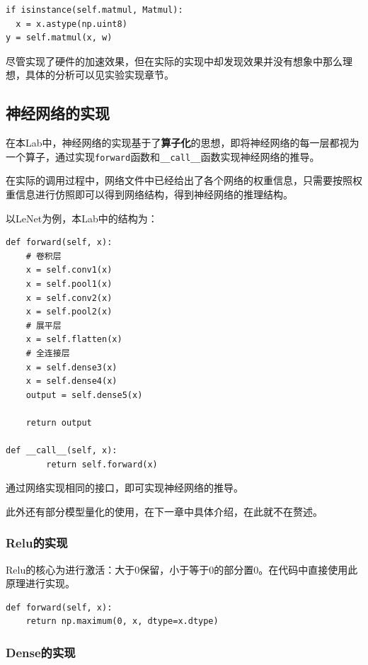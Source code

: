 \documentclass[12pt,a4paper]{article}
\begin{document}
\begin{lstlisting}
if isinstance(self.matmul, Matmul):
  x = x.astype(np.uint8)
y = self.matmul(x, w)
\end{lstlisting}

尽管实现了硬件的加速效果，但在实际的实现中却发现效果并没有想象中那么理想，具体的分析可以见实验实现章节。

\subsection{神经网络的实现}

在本Lab中，神经网络的实现基于了\textbf{算子化}的思想，即将神经网络的每一层都视为一个算子，通过实现\texttt{forward}函数和\texttt{\_\_call\_\_}函数实现神经网络的推导。

在实际的调用过程中，网络文件中已经给出了各个网络的权重信息，只需要按照权重信息进行仿照即可以得到网络结构，得到神经网络的推理结构。

以LeNet为例，本Lab中的结构为：

\begin{lstlisting}
def forward(self, x):
    # 卷积层
    x = self.conv1(x)
    x = self.pool1(x)
    x = self.conv2(x)
    x = self.pool2(x)
    # 展平层
    x = self.flatten(x)
    # 全连接层
    x = self.dense3(x)
    x = self.dense4(x)
    output = self.dense5(x)

    return output

def __call__(self, x):
        return self.forward(x)
\end{lstlisting}

通过网络实现相同的接口，即可实现神经网络的推导。

此外还有部分模型量化的使用，在下一章中具体介绍，在此就不在赘述。

\subsubsection{Relu的实现}

Relu的核心为进行激活：大于0保留，小于等于0的部分置0。在代码中直接使用此原理进行实现。

\begin{lstlisting}
def forward(self, x):
    return np.maximum(0, x, dtype=x.dtype)
\end{lstlisting}

\subsubsection{Dense的实现}
\end{document}
